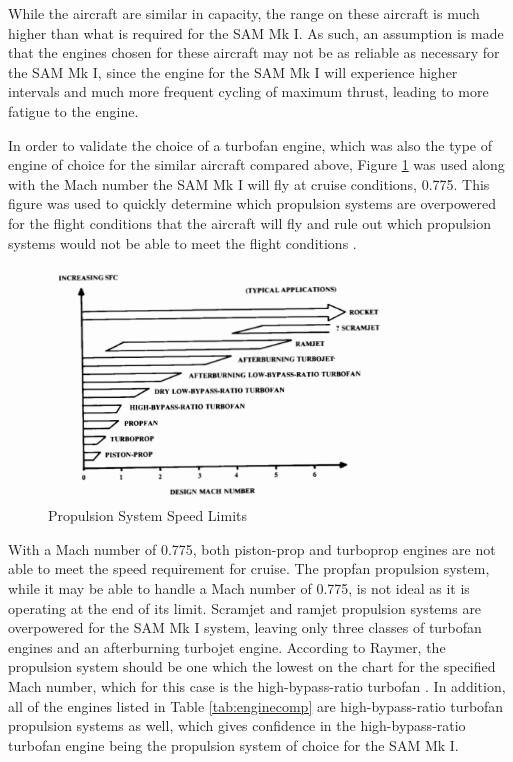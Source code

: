 While the aircraft are similar in capacity, the range on these aircraft is much higher than what is required for the SAM Mk I. As such, an assumption is made that the engines chosen for these aircraft may not be as reliable as necessary for the SAM Mk I, since the engine for the SAM Mk I will experience higher intervals and much more frequent cycling of maximum thrust, leading to more fatigue to the engine. 

In order to validate the choice of a turbofan engine, which was also the type of engine of choice for the similar aircraft compared above, Figure \ref{PropSelection} was used along with the Mach number the SAM Mk I will fly at cruise conditions, 0.775. This figure was used to quickly determine which propulsion systems are overpowered for the flight conditions that the aircraft will fly and rule out which propulsion systems would not be able to meet the flight conditions \cite{raymer}.

\begin{figure} [h!]
    \centering
    \includegraphics[width=0.8\textwidth]{Photos/PropSelection.PNG}
    \caption{Propulsion System Speed Limits}
    \label{PropSelection}
\end{figure}

\newpage
With a Mach number of 0.775, both piston-prop and turboprop engines are not able to meet the speed requirement for cruise. The propfan propulsion system, while it may be able to handle a Mach number of 0.775, is not ideal as it is operating at the end of its limit. Scramjet and ramjet propulsion systems are overpowered for the SAM Mk I system, leaving only three classes of turbofan engines and an afterburning turbojet engine. According to Raymer, the propulsion system should be one which the lowest on the chart for the specified Mach number, which for this case is the high-bypass-ratio turbofan \cite{raymer}. In addition, all of the engines listed in Table \ref{tab:enginecomp} are high-bypass-ratio turbofan propulsion systems as well, which gives confidence in the high-bypass-ratio turbofan engine being the propulsion system of choice for the SAM Mk I.

